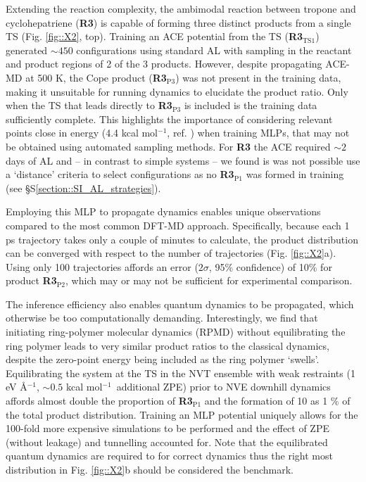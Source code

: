 \documentclass[twoside,twocolumn,9pt]{article}
\newcommand{\kcal}{kcal mol$^{-1}$}
\begin{document}
Extending the reaction complexity, the ambimodal reaction between tropone and cyclohepatriene ({\bfseries{R3}}) is capable of forming three distinct products from a single TS (Fig. \ref{fig::X2}, top).\cite{Jamieson2021} Training an ACE potential from the TS ({\bfseries{R3$_\text{TS1}$}}) generated $\sim450$ configurations using standard AL with sampling in the reactant and product regions of 2 of the 3 products. However, despite propagating ACE-MD at 500 K, the Cope product ({\bfseries{R3$_\text{P3}$}}) was not present in the training data, making it unsuitable for running dynamics to elucidate the product ratio. Only when the TS that leads directly to {\bfseries{R3$_\text{P3}$}} is included is the training data sufficiently complete. This highlights the importance of considering relevant points close in energy (4.4 \kcal, ref. ) when training MLPs, that may not be obtained using automated sampling methods. For {\bfseries{R3}} the ACE required $\sim 2$ days of AL and -- in contrast to simple systems -- we found is was not possible use a `distance' criteria to select configurations as no {\bfseries{R3$_\text{P1}$}} was formed in training (see §S\ref{section::SI_AL_strategies}).


Employing this MLP to propagate dynamics enables unique observations compared to the most common DFT-MD approach. Specifically, because each 1 ps trajectory takes only a couple of minutes to calculate, the product distribution can be converged with respect to the number of trajectories (Fig. \ref{fig::X2}a). Using only 100 trajectories affords an error ($2\sigma$, 95\% confidence) of 10\% for product {\bfseries{R3$_\text{P2}$}}, which may or may not be sufficient for experimental comparison.


The inference efficiency also enables quantum dynamics to be propagated, which otherwise be too computationally demanding. Interestingly, we find that initiating ring-polymer molecular dynamics (RPMD)\cite{Habershon2013} without equilibrating the ring polymer leads to very similar product ratios to the classical dynamics, despite the zero-point energy being included as the ring polymer `swells’. Equilibrating the system at the TS in the NVT ensemble with weak restraints (1 eV \AA$^{-1}$, $\sim0.5$ \kcal~additional ZPE) prior to NVE downhill dynamics affords almost double the proportion of {\bfseries{R3$_\text{P1}$}} and the formation of 10 as 1 \% of the total product distribution. Training an MLP potential uniquely allows for the 100-fold more expensive simulations to be performed and the effect of ZPE (without leakage\cite{Lee2018}) and tunnelling accounted for. Note that the equilibrated quantum dynamics are required to for correct dynamics\cite{Liu2019} thus the right most distribution in Fig. \ref{fig::X2}b should be considered the benchmark.
\end{document}
